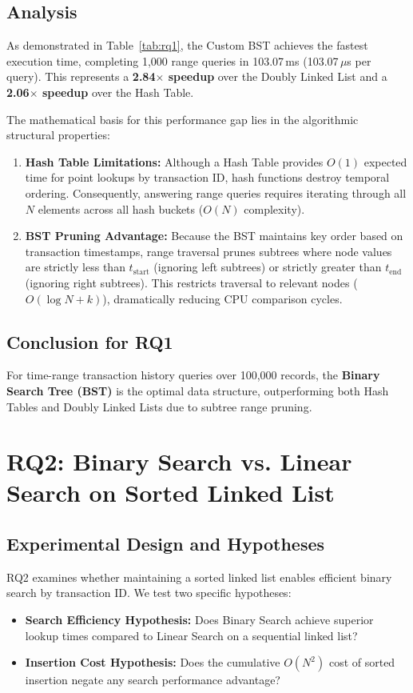 \documentclass[11pt]{article}
\begin{document}
\subsection{Analysis}
As demonstrated in Table~\ref{tab:rq1}, the Custom BST achieves the fastest execution time, completing 1,000 range queries in 103.07\,ms (103.07\,$\mu$s per query). This represents a \textbf{2.84$\times$ speedup} over the Doubly Linked List and a \textbf{2.06$\times$ speedup} over the Hash Table.

The mathematical basis for this performance gap lies in the algorithmic structural properties:
\begin{enumerate}[leftmargin=1.5em]
    \item \textbf{Hash Table Limitations:} Although a Hash Table provides $O(1)$ expected time for point lookups by transaction ID, hash functions destroy temporal ordering. Consequently, answering range queries requires iterating through all $N$ elements across all hash buckets ($O(N)$ complexity).
    \item \textbf{BST Pruning Advantage:} Because the BST maintains key order based on transaction timestamps, range traversal prunes subtrees where node values are strictly less than $t_{\text{start}}$ (ignoring left subtrees) or strictly greater than $t_{\text{end}}$ (ignoring right subtrees). This restricts traversal to relevant nodes ($O(\log N + k)$), dramatically reducing CPU comparison cycles.
\end{enumerate}

\subsection{Conclusion for RQ1}
For time-range transaction history queries over 100,000 records, the \textbf{Binary Search Tree (BST)} is the optimal data structure, outperforming both Hash Tables and Doubly Linked Lists due to subtree range pruning.

\section{RQ2: Binary Search vs. Linear Search on Sorted Linked List}

\subsection{Experimental Design and Hypotheses}
RQ2 examines whether maintaining a sorted linked list enables efficient binary search by transaction ID. We test two specific hypotheses:
\begin{itemize}[leftmargin=1.5em]
    \item \textbf{Search Efficiency Hypothesis:} Does Binary Search achieve superior lookup times compared to Linear Search on a sequential linked list?
    \item \textbf{Insertion Cost Hypothesis:} Does the cumulative $O(N^2)$ cost of sorted insertion negate any search performance advantage?
\end{itemize}
\end{document}
